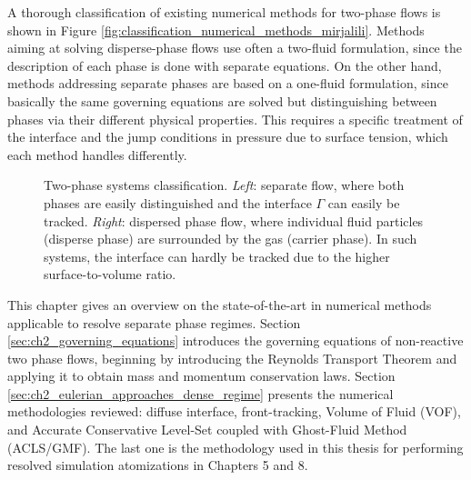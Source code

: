 A thorough classification of existing numerical methods for two-phase flows is shown in Figure \ref{fig:classification_numerical_methods_mirjalili}. Methods aiming at solving disperse-phase flows use often a two-fluid formulation, since the description of each phase is done with separate equations. On the other hand, methods addressing separate phases are based on a one-fluid formulation, since basically the same governing equations are solved but distinguishing between phases via their different physical properties. This requires a specific treatment of the interface and the jump conditions in pressure due to surface tension, which each method handles differently. 

\newpage

\begin{figure}[h!]	
	\centering
	\caption[Two-phase systems classification]{Two-phase systems classification. \textsl{Left}: separate flow, where both phases are easily distinguished and the interface $\Gamma$ can easily be tracked. \textsl{Right}: dispersed phase flow, where individual fluid particles (disperse phase) are surrounded by the gas (carrier phase). In such systems, the interface can hardly be tracked due to the higher surface-to-volume ratio.}
	\label{fig:TPF_droplets_example}
\end{figure}

This chapter gives an overview on the state-of-the-art in numerical methods applicable to resolve separate phase regimes. Section \ref{sec:ch2_governing_equations} introduces the governing equations of non-reactive two phase flows, beginning by introducing the Reynolds Transport Theorem and applying it to obtain mass and momentum conservation laws. Section \ref{sec:ch2_eulerian_approaches_dense_regime} presents the numerical methodologies reviewed: diffuse interface, front-tracking, Volume of Fluid (VOF), and Accurate Conservative Level-Set coupled with Ghost-Fluid Method (ACLS/GMF). The last one is the methodology used in this thesis for performing resolved simulation atomizations in Chapters 5 and 8.%


